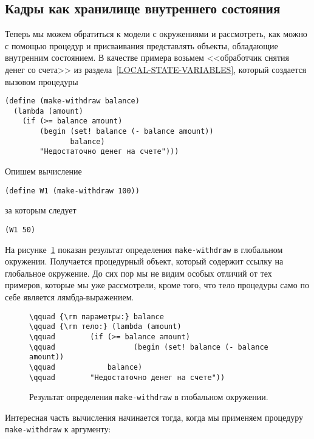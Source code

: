 \subsection{Кадры как хранилище внутреннего состояния}
\label{FRAMES-AS-REPOSITORY-OF-LOCAL-STATE}


Теперь мы можем обратиться к модели с окружениями и
рассмотреть, как можно с помощью процедур и присваивания представлять
объекты, обладающие внутренним состоянием.  В качестве примера возьмем
<<обработчик снятия денег со счета>> из
раздела~\ref{LOCAL-STATE-VARIABLES}, который создается вызовом
процедуры

\begin{Verbatim}[fontsize=\small]
(define (make-withdraw balance)
  (lambda (amount)
    (if (>= balance amount)
        (begin (set! balance (- balance amount))
               balance)
        "Недостаточно денег на счете")))
\end{Verbatim}
Опишем вычисление

\begin{Verbatim}[fontsize=\small]
(define W1 (make-withdraw 100))
\end{Verbatim}
за которым следует

\begin{Verbatim}[fontsize=\small]
(W1 50)
\end{Verbatim}
На рисунке~\ref{P3.6} показан результат определения
{\tt make-withdraw} в глобальном окружении.  Получается
процедурный объект, который содержит ссылку на глобальное окружение.
До сих пор мы не видим особых отличий от тех примеров, которые мы уже
рассмотрели, кроме того, что тело процедуры само по себе является
лямбда-выражением.


\begin{figure}
\begin{center}

\end{center}
\begin{Verbatim}
\qquad {\rm параметры:} balance
\qquad {\rm тело:} (lambda (amount)
\qquad	      (if (>= balance amount)
\qquad                  (begin (set! balance (- balance amount))
\qquad	          balance)
\qquad	      "Недостаточно денег на счете"))
\end{Verbatim}

\caption{Результат определения {\tt make-withdraw} в глобальном окружении.}
\label{P3.6}

\end{figure}
Интересная часть вычисления начинается тогда, когда мы
применяем процедуру {\tt make-withdraw} к аргументу:

